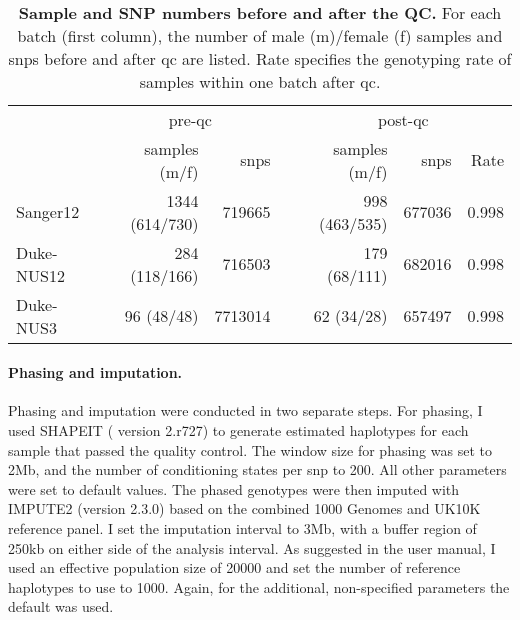 \\
\begin{table}[htbp]
  \centering
  \caption[\textbf{Sample and SNP numbers before and after the QC. }]{\textbf{Sample and SNP numbers before and after the QC. } For each batch (first column), the number of male (m)/female (f) samples and \glspl{snp} before and after \gls{qc} are listed. Rate specifies the genotyping rate of samples within one batch after \gls{qc}. }
    \begin{tabular}{lrrrrrr}
    \toprule
          & \multicolumn{2}{c}{pre-\gls{qc}} &       & \multicolumn{3}{c}{post-\gls{qc}} \\
\cmidrule{2-3}\cmidrule{5-7}          & samples (m/f) & \glspl{snp}  &       & samples (m/f) & \glspl{snp}  & Rate \\
\cmidrule{2-7}    Sanger12 & \num{1344}  (\num{614}/\num{730}) & \num{719665} &       & \num{998} (\num{463}/\num{535}) & \num{677036} & \num{0.998} \\
    Duke-NUS12 & \num{284} (\num{118}/\num{166}) & \num{716503} &       & \num{179} (\num{68}/\num{111}) & \num{682016} & \num{0.998} \\
    Duke-NUS3 & \num{96} (\num{48}/\num{48}) & \num{7713014} &       & \num{62} (\num{34}/\num{28}) & \num{657497} & \num{0.998} \\
    \bottomrule
    \end{tabular}%
    \label{tab:genoOverview}%
\end{table}%

\paragraph{Phasing and imputation.} Phasing and imputation were conducted in two separate steps. For phasing, I used SHAPEIT ( version 2.r727) \citep{Delaneau2012,Delaneau2013} to generate estimated haplotypes for each sample that passed the quality control. The window size for phasing was set to 2Mb, and the number of conditioning states per \gls{snp} to \num{200}. All other parameters were set to default values. The phased genotypes were then imputed with IMPUTE2  (version 2.3.0) \citep{Marchini2007, Howie2009} based on the combined \num{1000} Genomes \citep{1000Genomes2015} and UK10K \citep{UK10KConsortium2015} reference panel. I set the imputation interval to 3Mb,  with a buffer region of \num{250}kb on either side of the analysis interval. As suggested in the user manual, I used an effective population size of \num{20000} and set the number of reference haplotypes to use to \num{1000}. Again, for the additional, non-specified parameters the default was used.

